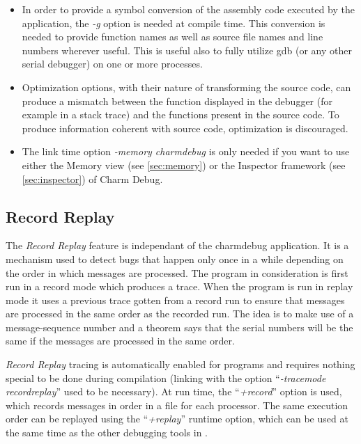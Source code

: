 \documentclass[10pt]{article}
\begin{document}
\begin{itemize}

\item In order to provide a symbol conversion of the assembly code executed
by the application, the \textit{-g} option is needed at compile time. This
conversion is needed to provide function names as well as source file names
and line numbers wherever useful. This is useful also to fully utilize gdb
(or any other serial debugger) on one or more processes.

\item Optimization options, with their nature of transforming the source code,
can produce a mismatch between the function displayed in the debugger (for
example in a stack trace) and the functions present in the source code. To
produce information coherent with source code, optimization is discouraged.

\item The link time option \textit{-memory charmdebug} is only needed if
you want to use either the Memory view (see \ref{sec:memory}) or the Inspector
framework (see \ref{sec:inspector}) of Charm Debug.

\end{itemize}

\subsection{Record Replay}

The \textit{Record Replay} feature is independant of the charmdebug
application.  It is a mechanism used to detect bugs that happen only
once in a while depending on the order in which messages are
processed. The program in consideration is first run in a record mode
which produces a trace. When the program is run in replay mode it uses
a previous trace gotten from a record run to ensure that messages are
processed in the same order as the recorded run. The idea is to make
use of a message-sequence number and a theorem says that the serial
numbers will be the same if the messages are processed in the same
order. \cite{rashmithesis}

\textit{Record Replay} tracing is automatically enabled for \charmpp{}
programs and requires nothing special to be done during compilation
(linking with the option ``\textit{-tracemode recordreplay}'' used to
be necessary).  At run time, the ``\textit{+record}'' option is used,
which records messages in order in a file for each processor.  The
same execution order can be replayed using the ``\textit{+replay}''
runtime option, which can be used at the same time as the other
debugging tools in \charmpp{}.
\end{document}
